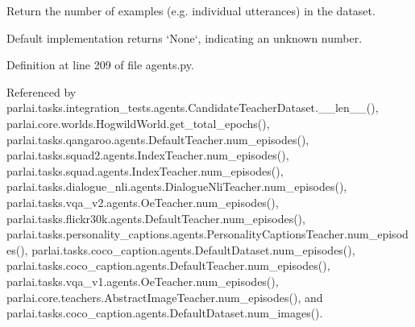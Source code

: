 \begin{DoxyVerb}Return the number of examples (e.g. individual utterances) in the dataset.

Default implementation returns `None`, indicating an unknown number.
\end{DoxyVerb}
 

Definition at line 209 of file agents.\+py.



Referenced by parlai.\+tasks.\+integration\+\_\+tests.\+agents.\+Candidate\+Teacher\+Dataset.\+\_\+\+\_\+len\+\_\+\+\_\+(), parlai.\+core.\+worlds.\+Hogwild\+World.\+get\+\_\+total\+\_\+epochs(), parlai.\+tasks.\+qangaroo.\+agents.\+Default\+Teacher.\+num\+\_\+episodes(), parlai.\+tasks.\+squad2.\+agents.\+Index\+Teacher.\+num\+\_\+episodes(), parlai.\+tasks.\+squad.\+agents.\+Index\+Teacher.\+num\+\_\+episodes(), parlai.\+tasks.\+dialogue\+\_\+nli.\+agents.\+Dialogue\+Nli\+Teacher.\+num\+\_\+episodes(), parlai.\+tasks.\+vqa\+\_\+v2.\+agents.\+Oe\+Teacher.\+num\+\_\+episodes(), parlai.\+tasks.\+flickr30k.\+agents.\+Default\+Teacher.\+num\+\_\+episodes(), parlai.\+tasks.\+personality\+\_\+captions.\+agents.\+Personality\+Captions\+Teacher.\+num\+\_\+episodes(), parlai.\+tasks.\+coco\+\_\+caption.\+agents.\+Default\+Dataset.\+num\+\_\+episodes(), parlai.\+tasks.\+coco\+\_\+caption.\+agents.\+Default\+Teacher.\+num\+\_\+episodes(), parlai.\+tasks.\+vqa\+\_\+v1.\+agents.\+Oe\+Teacher.\+num\+\_\+episodes(), parlai.\+core.\+teachers.\+Abstract\+Image\+Teacher.\+num\+\_\+episodes(), and parlai.\+tasks.\+coco\+\_\+caption.\+agents.\+Default\+Dataset.\+num\+\_\+images().

